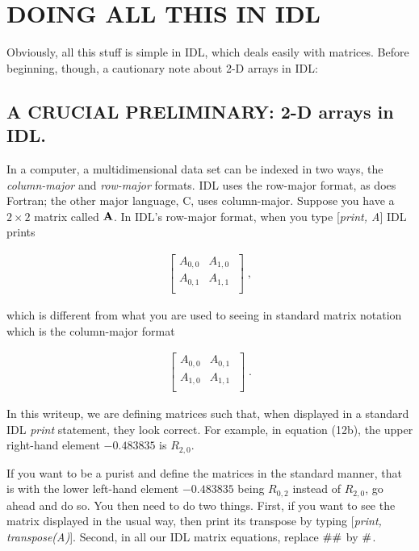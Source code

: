 \section {DOING ALL THIS IN IDL}

	Obviously, all this stuff is simple in IDL, which deals easily with
matrices. Before beginning, though, a cautionary note about 2-D arrays
in IDL:

\subsection {A CRUCIAL PRELIMINARY: 2-D arrays in IDL.}

	In a computer, a multidimensional data set can be indexed in two
ways, the {\it column-major} and {\it row-major} formats.  IDL uses the
row-major format, as does Fortran; the other major language, C, uses
column-major.  Suppose you have a $2 \times 2$ matrix called ${\bf A}$. 
In IDL's row-major format, when you type [{\it print, A}] IDL prints

\begin{mathletters} 
\begin{eqnarray} 
\left[ 
\begin{array}{rrr}
A_{0,0} & A_{1,0} \\
A_{0,1} & A_{1,1} \\
\end{array} 
\; \right] \; ,
\end{eqnarray} 

\noindent which is different from what you are used to seeing in
standard matrix notation which is the column-major format

\begin{eqnarray} 
\left[ 
\begin{array}{rrr}
A_{0,0} & A_{0,1} \\
A_{1,0} & A_{1,1} \\
\end{array} 
\; \right] \; .
\end{eqnarray} 
\end{mathletters} 

	In this writeup, we are defining matrices such that, when
displayed in a standard IDL {\it print} statement, they look correct.
For example, in equation (12b), the upper right-hand element $-0.483835$
is $R_{2,0}$. 

	If you want to be a purist and define the matrices in the
standard manner, that is with the lower left-hand element $-0.483835$
being $R_{0,2}$ instead of $R_{2,0}$, go ahead and do so.  You then need
to do two things.  First, if you want to see the matrix displayed in the
usual way, then print its transpose by typing [{\it print,
transpose(A)}].  Second, in all our IDL matrix equations, replace ${\bf
\# \#}$ by ${\bf \#}$. 

